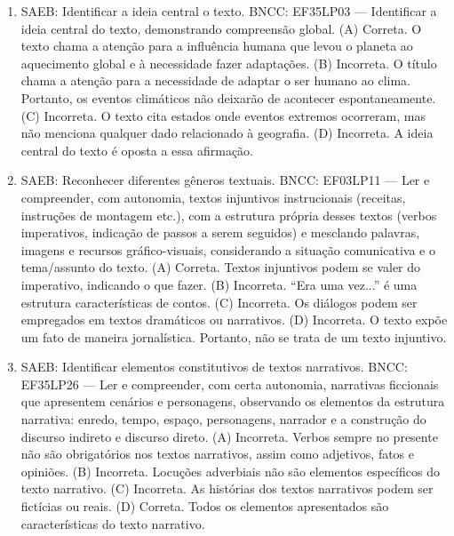 \begin{enumerate}
\item
SAEB: Identificar a ideia central o texto. 
BNCC: EF35LP03 --- Identificar a ideia central do texto, demonstrando compreensão global. 
(A) Correta. O texto chama a atenção para a influência humana que levou o planeta ao aquecimento global e à necessidade fazer adaptações. 
(B) Incorreta. O título chama a atenção para a necessidade de adaptar o ser humano ao clima. Portanto, os eventos climáticos não deixarão de acontecer espontaneamente. 
(C) Incorreta. O texto cita estados onde eventos extremos ocorreram, mas não menciona qualquer dado relacionado à geografia. 
(D) Incorreta. A ideia central do texto é oposta a essa afirmação.

\item
SAEB: Reconhecer diferentes gêneros textuais. 
BNCC: EF03LP11 --- Ler e compreender, com autonomia, textos injuntivos instrucionais (receitas, instruções de montagem etc.), com a estrutura própria desses textos (verbos imperativos, indicação de passos a serem seguidos) e mesclando palavras, imagens e recursos gráfico-visuais, considerando a situação comunicativa e o tema/assunto do texto. 
(A) Correta. Textos injuntivos podem se valer do imperativo, indicando o que fazer. 
(B) Incorreta. ``Era uma vez...'' é uma estrutura características de contos. 
(C) Incorreta. Os diálogos podem ser empregados em textos dramáticos ou narrativos. 
(D) Incorreta. O texto expõe um fato de maneira jornalística. Portanto, não se trata de um texto injuntivo.

\item
SAEB: Identificar elementos constitutivos de textos narrativos. 
BNCC: EF35LP26 --- Ler e compreender, com certa autonomia, narrativas ficcionais que apresentem cenários e personagens, observando os elementos da estrutura narrativa: enredo, tempo, espaço, personagens, narrador e a construção do discurso indireto e discurso direto. 
(A) Incorreta. Verbos sempre no presente não são obrigatórios nos textos narrativos, assim como adjetivos, fatos e opiniões. 
(B) Incorreta. Locuções adverbiais não são elementos específicos do texto narrativo. 
(C) Incorreta. As histórias dos textos narrativos podem ser fictícias ou reais. 
(D) Correta. Todos os elementos apresentados são características do texto narrativo.


\end{enumerate}
